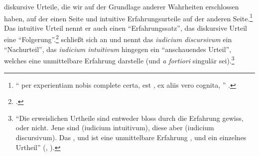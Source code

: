 diskursive Urteile, die wir auf der Grundlage anderer Wahrheiten erschlossen
haben, auf der einen Seite und intuitive Erfahrungsurteile auf der
anderen Seite.\footnote{\enquote{ per experientiam
    nobis complete certa, est , ex aliis vero cognita,
    } \parencite[][\S~166]{Baumgarten:AcroasislogicainChristianumL.B.deWolff1983}.}
Das intuitive Urteil nennt er auch einen \enquote{Erfahrungssatz}, das
diskursive Urteil eine
\enquote{Folgerung}.\footcite[Vgl.][\S~166]{Baumgarten:AcroasislogicainChristianumL.B.deWolff1983}
 schließt sich
 an und nennt das
\emph{iudicium discursivum} ein \enquote{Nachurteil}, das \emph{iudicium
intuitivum} hingegen ein \enquote{anschauendes Urteil}, welches eine
unmittelbare Erfahrung darstelle (und \emph{a fortiori} singulär
sei).\footnote{\enquote{Die erweislichen Urtheile sind entweder bloss durch die
Erfahrung gewiss, oder nicht. Jene sind  (iudicium
intuitivum), diese aber  (iudicium discursivum). Das
, und ist eine
unmittelbare Erfahrung {\punkt}, und ein einzelnes Urtheil}
\mkbibparens{\cite[][\S~319]{Meier:AuszugausderVernunftlehre1752},
\cite[][XVI: 674.24--28]{Kant:GesammelteWerke1900ff.}}.}


